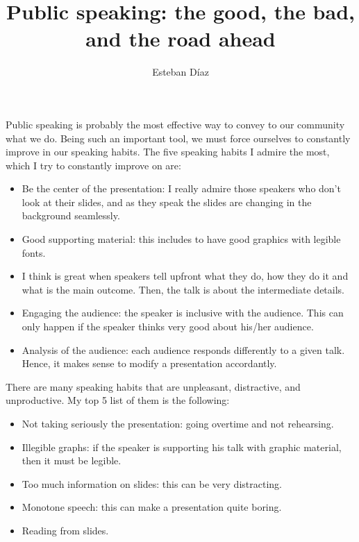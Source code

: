 \documentclass[11pt]{article}
\author{Esteban D\'{i}az}
\title{Public speaking: the good, the bad, and the road ahead}{}
\begin{document}
%

\maketitle
Public speaking is probably the most effective way to convey to our community what we do. 
 Being such an important tool, we must force ourselves to constantly improve in 
our speaking habits. The five speaking habits I admire the most, which I try to constantly
improve on are:
\begin{itemize}
  \item Be the center of the presentation: I really admire those speakers who don't look
        at their slides, and as they speak the slides are changing in the background seamlessly. 

  \item Good supporting material: this includes to have good graphics with legible fonts. 

  \item I think is great when speakers tell upfront what they do, how they do it and what is 
        the main outcome. Then, the talk is about the intermediate details.
  
  \item Engaging the audience: the speaker is inclusive with 
        the audience. This can only happen if the speaker thinks very good  
        about his/her audience. 

  \item Analysis of the audience: each audience responds differently to a given 
        talk. Hence, it makes sense to modify a presentation accordantly. 

\end{itemize}

There are many speaking habits that are unpleasant, distractive, and unproductive. My top
5 list of them is the following:
\begin{itemize}
  \item Not taking seriously the presentation: going overtime and not rehearsing. 
  \item Illegible graphs: if the speaker is supporting his talk with graphic 
        material, then it must be legible.
  \item Too much information on slides: this can be very distracting. 
  \item Monotone speech: this can make a presentation quite boring. 
  \item Reading from slides. 
\end{itemize}
\end{document}
